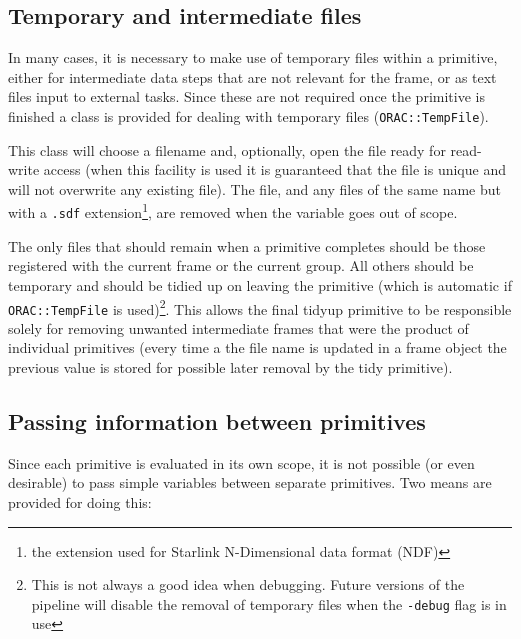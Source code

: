 \documentclass[twoside,11pt]{article}
\renewcommand{\_}{\texttt{\symbol{95}}}
\begin{document}
\subsection{Temporary and intermediate files\label{tempfiles}}

In many cases, it is necessary to make use of temporary files
within a primitive, either for intermediate data steps that are not
relevant for the frame, or as text files input to external tasks. Since
these are not required once the primitive is finished a class is
provided for dealing with temporary files (\texttt{ORAC::TempFile}).

This class will choose a filename and, optionally, open the file ready 
for read-write access (when this facility is used it is guaranteed that the
file is unique and will not overwrite any existing file). The file,
and any files of the same name but with a \texttt{.sdf}
extension\footnote{the extension used for Starlink N-Dimensional data
format (NDF)}, are removed when the variable goes out of scope.

The only files that should remain when a primitive completes should be
those registered with the current frame or the current group. All
others should be temporary and should be tidied up on leaving the
primitive (which is automatic if \texttt{ORAC::TempFile} is
used)\footnote{This is not always a good idea when debugging. Future
  versions of the pipeline will disable the removal of temporary files 
  when the \texttt{-debug} flag is in use}.
This allows the final tidyup primitive to be responsible solely for
removing unwanted intermediate frames that were the product of
individual primitives (every time a the file name is updated in a
frame object the previous value is stored for possible later removal
by the tidy primitive). 

\subsection{Passing information between primitives\label{information_passing}}

Since each primitive is evaluated in its own scope, it is not possible 
(or even desirable) to pass simple variables between separate
primitives. Two means are provided for doing this:
\end{document}

